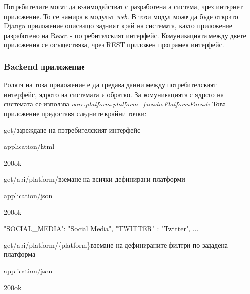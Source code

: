 \documentclass{article}
\begin{document}
Потребителите могат да взаимодействат с разработената система, чрез интернет приложение. То се намира в модулът
\textit{web}. В този модул може да бъде открито Django приложение описващо задният край на системата, както приложение
разработено на React - потребителският интерфейс. Комуникацията между двете приложения се осъществява, чрез REST
приложен програмен интерфейс.

\subsubsection{Backend приложение}

Ролята на това приложение е да предава данни между потребителският интерфейс, ядрото на системата и обратно. За
комуникацията с ядрото на системата се използва \textit{core.platform.platform\_facade.PlatformFacade} Това приложение
предоставя следните крайни точки:

\begin{apiRoute}{get}{/}{зареждане на потребителският интерфейс}
\begin{routeResponse}{application/html}
\begin{routeResponseItem}{200}{ok}
\end{routeResponseItem}
\end{routeResponse}
\end{apiRoute}

\begin{apiRoute}{get}{/api/platform/}{вземане на всички дефинирани платформи}
\begin{routeResponse}{application/json}
\begin{routeResponseItem}{200}{ok}
\begin{routeResponseItemBody}
{
"SOCIAL_MEDIA": "Social Media",
"TWITTER" : "Twitter",
...
}
\end{routeResponseItemBody}
\end{routeResponseItem}
\end{routeResponse}
\end{apiRoute}

\begin{apiRoute}{get}{/api/platform/\{platform\}}{вземане на дефинираните филтри по зададена платформа}
\begin{routeParameter}
\end{routeParameter}
\begin{routeResponse}{application/json}
\begin{routeResponseItem}{200}{ok}
\begin{routeResponseItemBody}
\end{routeResponseItemBody}
\end{routeResponseItem}
\end{routeResponse}
\end{apiRoute}
\end{document}

